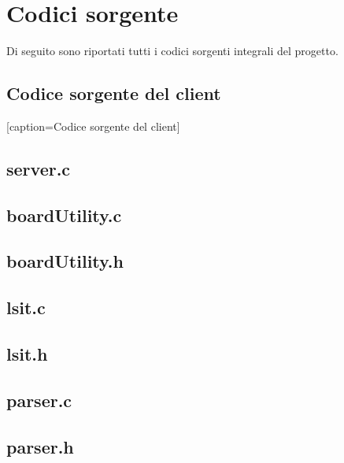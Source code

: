 \documentclass[a4paper]{article}
\begin{document}
\section{Codici sorgente}
Di seguito sono riportati tutti i codici sorgenti integrali del progetto.
\subsection{Codice sorgente del client}
[caption=Codice sorgente del client]

\subsection{server.c}
\subsection{boardUtility.c}
\subsection{boardUtility.h}
\subsection{lsit.c}
\subsection{lsit.h}
\subsection{parser.c}
\subsection{parser.h}
\lstlistoflistings
\end{document}
